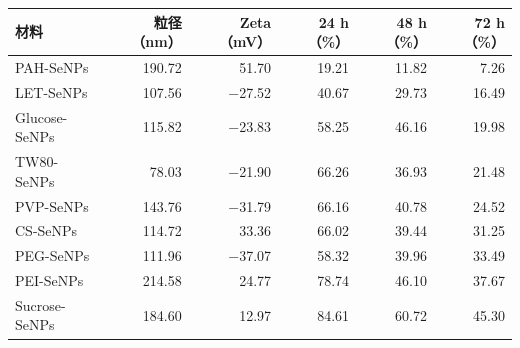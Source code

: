 \begin{tabular}{lrrrrr}
\toprule
材料 & 粒径（nm） & Zeta（mV） & 24 h（\%） & 48 h（\%） & 72 h（\%） \\
\midrule
PAH-SeNPs & 190.72 & 51.70 & 19.21 & 11.82 & 7.26 \\
LET-SeNPs & 107.56 & \ensuremath{\mathord{-}}27.52 & 40.67 & 29.73 & 16.49 \\
Glucose-SeNPs & 115.82 & \ensuremath{\mathord{-}}23.83 & 58.25 & 46.16 & 19.98 \\
TW80-SeNPs & 78.03 & \ensuremath{\mathord{-}}21.90 & 66.26 & 36.93 & 21.48 \\
PVP-SeNPs & 143.76 & \ensuremath{\mathord{-}}31.79 & 66.16 & 40.78 & 24.52 \\
CS-SeNPs & 114.72 & 33.36 & 66.02 & 39.44 & 31.25 \\
PEG-SeNPs & 111.96 & \ensuremath{\mathord{-}}37.07 & 58.32 & 39.96 & 33.49 \\
PEI-SeNPs & 214.58 & 24.77 & 78.74 & 46.10 & 37.67 \\
Sucrose-SeNPs & 184.60 & 12.97 & 84.61 & 60.72 & 45.30 \\
\bottomrule
\end{tabular}
